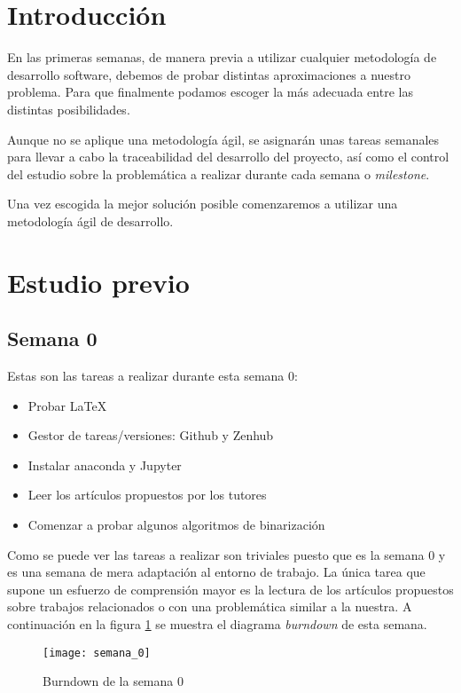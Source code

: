
\section{Introducción}
En las primeras semanas, de manera previa a utilizar cualquier metodología de desarrollo software, debemos de probar distintas aproximaciones a nuestro problema. Para que finalmente podamos escoger la más adecuada entre las distintas posibilidades.

Aunque no se aplique una metodología ágil, se asignarán unas tareas semanales para llevar a cabo la traceabilidad del desarrollo del proyecto, así como el control del estudio sobre la problemática a realizar durante cada semana o \textit{milestone}.

Una vez escogida la mejor solución posible comenzaremos a utilizar una metodología ágil de desarrollo.

\section{Estudio previo}

\subsection{Semana 0}
Estas son las tareas a realizar durante esta semana 0:

\begin{itemize}
	\item Probar LaTeX
	\item Gestor de tareas/versiones: Github y Zenhub
	\item Instalar anaconda y Jupyter
	\item Leer los artículos propuestos por los tutores
	\item Comenzar a probar algunos algoritmos de binarización
\end{itemize}

Como se puede ver las tareas a realizar son triviales puesto que es la semana 0 y es una semana de mera adaptación al entorno de trabajo. La única tarea que supone un esfuerzo de comprensión mayor es la lectura de los artículos propuestos sobre trabajos relacionados o con una problemática similar a la nuestra. A continuación en la figura \ref{fig:A.1.1} se muestra el diagrama \textit{burndown} de esta semana. 

\begin{figure}[h]
\centering
\texttt{[image: semana\_0]}
\caption{Burndown de la semana 0}
\label{fig:A.1.1}
\end{figure}

